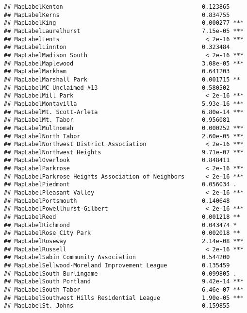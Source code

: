 \documentclass[]{article}
\begin{document}
\begin{verbatim}
## MapLabelKenton                                        0.123865    
## MapLabelKerns                                         0.834755    
## MapLabelKing                                          0.000277 ***
## MapLabelLaurelhurst                                   7.15e-05 ***
## MapLabelLents                                          < 2e-16 ***
## MapLabelLinnton                                       0.323484    
## MapLabelMadison South                                  < 2e-16 ***
## MapLabelMaplewood                                     3.08e-05 ***
## MapLabelMarkham                                       0.641203    
## MapLabelMarshall Park                                 0.001715 ** 
## MapLabelMC Unclaimed #13                              0.580502    
## MapLabelMill Park                                      < 2e-16 ***
## MapLabelMontavilla                                    5.93e-16 ***
## MapLabelMt. Scott-Arleta                              6.80e-14 ***
## MapLabelMt. Tabor                                     0.956081    
## MapLabelMultnomah                                     0.000252 ***
## MapLabelNorth Tabor                                   2.60e-05 ***
## MapLabelNorthwest District Association                 < 2e-16 ***
## MapLabelNorthwest Heights                             9.71e-07 ***
## MapLabelOverlook                                      0.848411    
## MapLabelParkrose                                       < 2e-16 ***
## MapLabelParkrose Heights Association of Neighbors      < 2e-16 ***
## MapLabelPiedmont                                      0.056034 .  
## MapLabelPleasant Valley                                < 2e-16 ***
## MapLabelPortsmouth                                    0.140648    
## MapLabelPowellhurst-Gilbert                            < 2e-16 ***
## MapLabelReed                                          0.001218 ** 
## MapLabelRichmond                                      0.043474 *  
## MapLabelRose City Park                                0.002018 ** 
## MapLabelRoseway                                       2.14e-08 ***
## MapLabelRussell                                        < 2e-16 ***
## MapLabelSabin Community Association                   0.544200    
## MapLabelSellwood-Moreland Improvement League          0.135459    
## MapLabelSouth Burlingame                              0.099805 .  
## MapLabelSouth Portland                                9.42e-14 ***
## MapLabelSouth Tabor                                   6.46e-07 ***
## MapLabelSouthwest Hills Residential League            1.90e-05 ***
## MapLabelSt. Johns                                     0.159855    

\end{verbatim}
\end{document}
